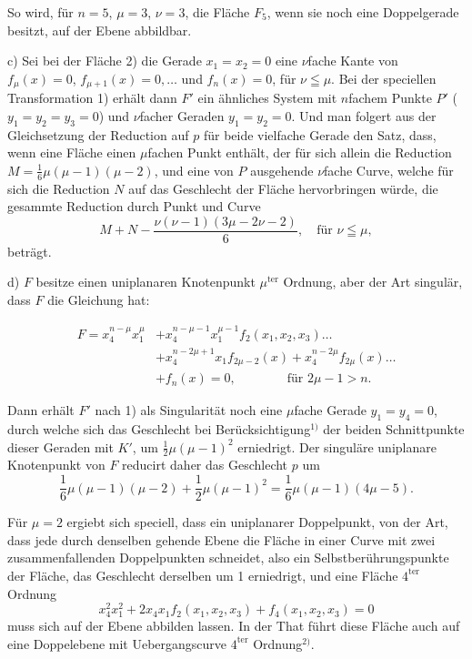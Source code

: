 \documentclass{article}
\begin{document}
So wird, für $n = 5$, $\mu = 3$, $\nu = 3$, die Fläche $F_5$, wenn sie noch eine Doppelgerade besitzt, auf der Ebene abbildbar.

c) Sei bei der Fläche 2) die Gerade $x_1 = x_2 = 0$ eine $\nu$fache Kante von $f_\mu(x) = 0$, $f_{\mu+1}(x) = 0, \ldots$ und $f_n(x) = 0$, für $\nu \leqq \mu$. Bei der speciellen Transformation 1) erhält dann $F'$ ein ähnliches System mit $n$fachem Punkte $P'$ ($y_1 = y_2 = y_3 = 0$) und $\nu$facher Geraden $y_1 = y_2 = 0$. Und man folgert aus der Gleichsetzung der Reduction auf $p$ für beide vielfache Gerade den Satz, dass, wenn eine Fläche einen $\mu$fachen Punkt enthält, der für sich allein die Reduction $M = \frac{1}{6}\mu(\mu-1)(\mu-2)$, und eine von $P$ ausgehende $\nu$fache Curve, welche für sich die Reduction $N$ auf das Geschlecht der Fläche hervorbringen würde, die gesammte Reduction durch Punkt und Curve
\[ M + N - \frac{\nu(\nu-1)(3\mu-2\nu-2)}{6}, \quad \text{für } \nu \leqq \mu, \]
beträgt.

d) $F$ besitze einen uniplanaren Knotenpunkt $\mu^{\text{ter}}$ Ordnung, aber der Art singulär, dass $F$ die Gleichung hat:

\[
\begin{aligned}
F = x_4^{n-\mu} x_1^\mu &+ x_4^{n-\mu-1} x_1^{\mu-1} f_2(x_1, x_2, x_3) \ldots \\
&+ x_4^{n-2\mu+1} x_1 f_{2\mu-2}(x) + x_4^{n-2\mu} f_{2\mu}(x) \ldots \\
&+ f_n(x) = 0, \qquad\qquad \text{für } 2\mu-1 > n.
\end{aligned}
\]

Dann erhält $F'$ nach 1) als Singularität noch eine $\mu$fache Gerade $y_1 = y_4 = 0$, durch welche sich das Geschlecht bei Berücksichtigung${}^{1)}$ der beiden Schnittpunkte dieser Geraden mit $K'$, um $\frac{1}{2}\mu(\mu-1)^2$ erniedrigt. Der singuläre uniplanare Knotenpunkt von $F$ reducirt daher das Geschlecht $p$ um
\[ \frac{1}{6}\mu(\mu-1)(\mu-2) + \frac{1}{2}\mu(\mu-1)^2 = \frac{1}{6}\mu(\mu-1)(4\mu-5). \]

Für $\mu = 2$ ergiebt sich speciell, dass ein uniplanarer Doppelpunkt, von der Art, dass jede durch denselben gehende Ebene die Fläche in einer Curve mit zwei zusammenfallenden Doppelpunkten schneidet, also ein Selbstberührungspunkte der Fläche, das Geschlecht derselben um 1 erniedrigt, und eine Fläche $4^{\text{ter}}$ Ordnung
\[ x_4^2 x_1^2 + 2 x_4 x_1 f_2(x_1, x_2, x_3) + f_4(x_1, x_2, x_3) = 0 \]
muss sich auf der Ebene abbilden lassen. In der That führt diese Fläche auch auf eine Doppelebene mit Uebergangscurve $4^{\text{ter}}$ Ordnung${}^{2)}$.
\end{document}
